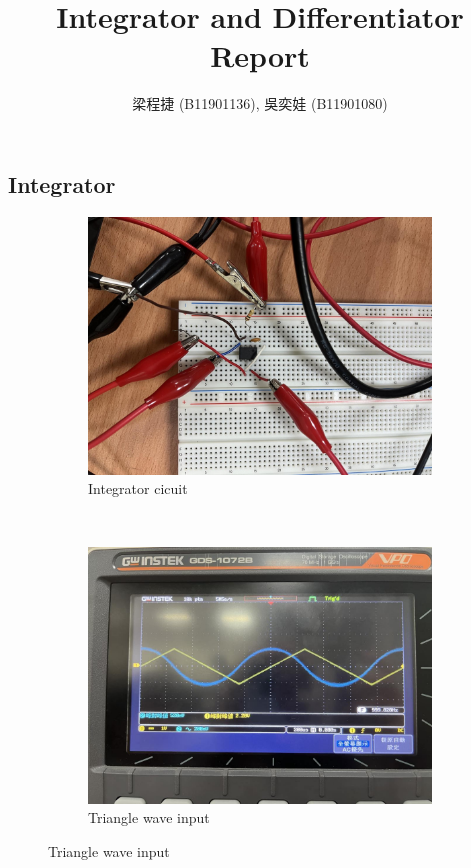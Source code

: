 \documentclass{article}
\title{Integrator and Differentiator Report}
\author{梁程捷 (B11901136), 吳奕娃 (B11901080)}
\date{}
\begin{document}
\begin{CJK*}{UTF8}{bkai}
\maketitle
\section{Integrator}



\begin{figure}[h]
\begin{center}

    \begin{subfigure}[b]{0.2\textwidth}
        \includegraphics[width=\textwidth]{int_circuit.jpg}
        \caption{Integrator cicuit}
    \end{subfigure}
    ~
    \begin{subfigure}[b]{0.3\textwidth}
        \includegraphics[width=\textwidth]{int_trig.jpg}
        \caption{Triangle wave input}
    \end{subfigure}


\end{center}
\end{figure}
\end{CJK*}
\end{document}
